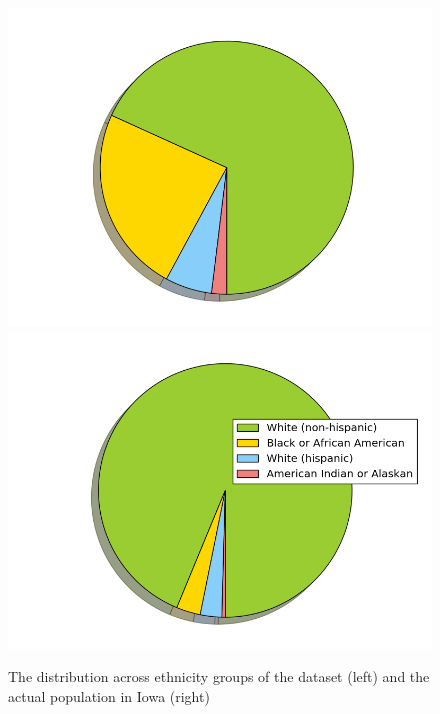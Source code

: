 \documentclass[sigconf]{acmart}
\begin{document}
\begin{figure}
    \centering
\includegraphics[scale=0.2]{figure_2.png}
\includegraphics[scale=0.2]{figure_1.png}
    \caption{The distribution across ethnicity groups of the dataset (left) and the actual population in Iowa (right)}
    \label{fig:mesh1}
\end{figure}
\end{document}
